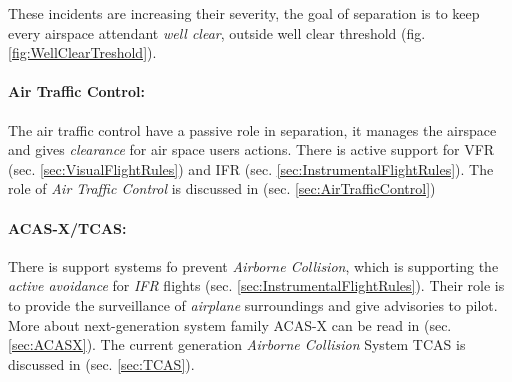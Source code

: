 \noindent These incidents are increasing their severity, the goal of separation is to keep every airspace attendant \emph{well clear}, outside well clear threshold (fig. \ref{fig:WellClearTreshold}). 
\paragraph{Air Traffic Control:} The air traffic control have a passive role in separation, it manages the airspace and gives \emph{clearance} for air space users actions. There is active support for VFR (sec. \ref{sec:VisualFlightRules}) and IFR (sec. \ref{sec:InstrumentalFlightRules}). The role of \emph{Air Traffic Control} is discussed in (sec. \ref{sec:AirTrafficControl})

\paragraph{ACAS-X/TCAS:} There is support systems fo prevent \emph{Airborne Collision}, which is supporting the \emph{active avoidance} for \emph{IFR} flights (sec. \ref{sec:InstrumentalFlightRules}). Their role is to provide the surveillance of \emph{airplane} surroundings and give advisories to pilot. More about next-generation system family ACAS-X can be read in (sec. \ref{sec:ACASX}). The current generation \emph{Airborne Collision} System TCAS is discussed in (sec. \ref{sec:TCAS}).

